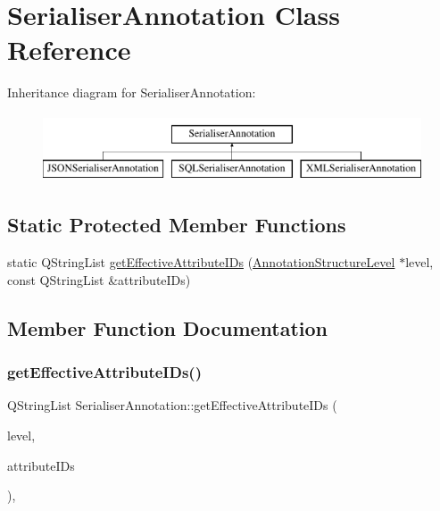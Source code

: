 \hypertarget{class_serialiser_annotation}{}\section{Serialiser\+Annotation Class Reference}
\label{class_serialiser_annotation}
Inheritance diagram for Serialiser\+Annotation\+:\begin{figure}[H]
\begin{center}
\leavevmode
\includegraphics[height=2.000000cm]{class_serialiser_annotation}
\end{center}
\end{figure}
\subsection*{Static Protected Member Functions}
\begin{DoxyCompactItemize}
\item 
static Q\+String\+List \hyperlink{class_serialiser_annotation_a9c446cb899e6c7301a9f45b6430b7f4e}{get\+Effective\+Attribute\+I\+Ds} (\hyperlink{class_annotation_structure_level}{Annotation\+Structure\+Level} $\ast$level, const Q\+String\+List \&attribute\+I\+Ds)
\end{DoxyCompactItemize}


\subsection{Member Function Documentation}
\mbox{\label{class_serialiser_annotation_a9c446cb899e6c7301a9f45b6430b7f4e}} 
\subsubsection{\texorpdfstring{get\+Effective\+Attribute\+I\+Ds()}{getEffectiveAttributeIDs()}}
{\footnotesize\ttfamily Q\+String\+List Serialiser\+Annotation\+::get\+Effective\+Attribute\+I\+Ds (\begin{DoxyParamCaption}\item[{\hyperlink{class_annotation_structure_level}{Annotation\+Structure\+Level} $\ast$}]{level,  }\item[{const Q\+String\+List \&}]{attribute\+I\+Ds }\end{DoxyParamCaption})\hspace{0.3cm}{\ttfamily [static]}, {\ttfamily [protected]}}


